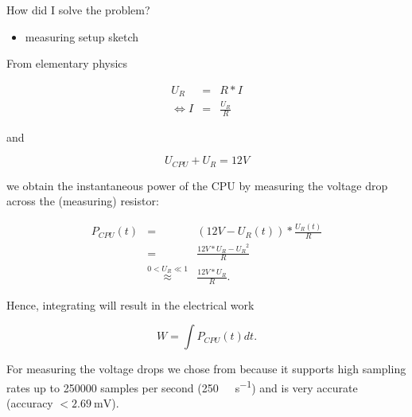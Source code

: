 
How did I solve the problem?

\begin{itemize}

\item measuring setup sketch

\end{itemize}


From elementary physics

\begin{eqnarray}
     U_R & = & R * I \\
  \iff I & = & \frac{U_R}{R}
\end{eqnarray}

and

\begin{equation}
  U_{CPU} + U_{R} = 12 V
\end{equation}

we obtain the instantaneous power of the CPU by measuring the voltage drop
across the (measuring) resistor:

\begin{eqnarray}
P_{CPU}(t) & = & (12V - U_R(t)) * \frac{U_R(t)}{R} \\
           & = & \frac{12V * U_R - {U_R}^2}{R} \\
           & \stackrel{0 < U_R \ll 1}{\approx} & \frac{12V * U_R}{R}.
\end{eqnarray}

Hence, integrating will result in the electrical work

\begin{equation}
  W = \int P_{CPU}(t)dt.
\end{equation}



For measuring the voltage drops we chose
from  because it supports
high sampling rates up to 250000 samples per second
(\SI{250}{\kilo\samples\per\second}) and is very
accurate (accuracy $< \SI{2.69}{\milli\volt}$)\cite{NISpec2009}.

